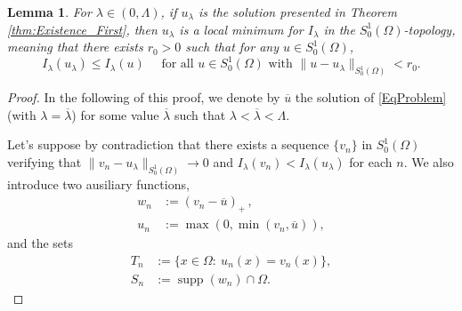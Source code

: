 \documentclass[11pt]{amsart}
\numberwithin{equation}{section} %
\newtheorem{lemma}[teo]{Lemma}
\theoremstyle{definition}
\def\G{\mathbb{G}}
\newcommand{\m}{\mbox}
\DeclareMathOperator{\supp}{supp}
\newcommand{\de}{\partial}
\begin{document}
\begin{lemma}\label{lem:locmin}
	For $\lambda\in (0,\Lambda)$, if $u_\lambda$ is the solution
	presented in Theorem \ref{thm:Existence_First}, then
	$u_\lambda$ is a local minimum for $I_\lambda$ in the $S^1_0(\Omega)$-topology,
	meaning that there exists $r_0>0$ such that for any $u\in S^1_0(\Omega)$,
	\[
	I_\lambda(u_\lambda)\leq I_\lambda(u) \quad \textrm{ for all } u\in S^{1}_{0}(\Omega) \textrm{ with } \|u-u_\lambda\|_{S_{0}^{1}(\Omega)}< r_0 .
	\]
\end{lemma}
\begin{proof}

	In the following of this proof, we denote by $\overline u$ the solution
	of \eqref{EqProblem} (with $\lambda = \overline \lambda$) for some value $\overline \lambda$
	such that  $\lambda<\overline \lambda <\Lambda$.
	
%	
%	
	
	Let's suppose by contradiction that there exists a sequence $\{v_n\}$ in $S^1_0(\Omega)$ verifying that
	$\|v_n-u_\lambda\|_{S_{0}^{1}(\Omega)}\to0$ and $I_\lambda(v_n)<I_\lambda(u_\lambda)$ for each $n$.
	We also introduce two ausiliary functions,
	\begin{align*}
		w_n&:=(v_n-\overline u)_+\, ,\\
		u_n&:=\max(0,\min(v_n,\overline u)),
	\end{align*}
	and the sets 
	\begin{align*}
		T_n&:=\{x\in \Omega:\ u_n(x)=v_n(x)\},\\
		S_n&:=\supp(w_n)\cap\Omega.
	\end{align*}
	

\end{proof}
\end{document}

